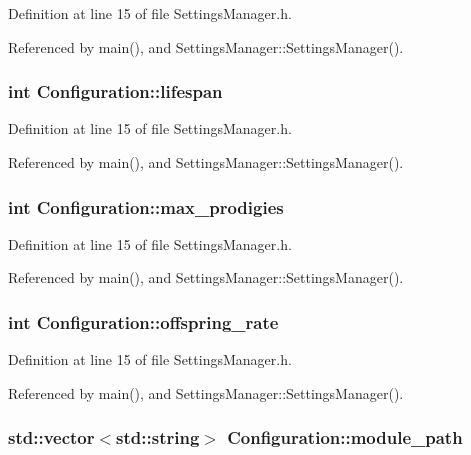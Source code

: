 Definition at line 15 of file SettingsManager.h.

Referenced by main(), and SettingsManager::SettingsManager().\hypertarget{classConfiguration_858ab0060803795860cfc447e6aa246e}{
\subsubsection{\setlength{\rightskip}{0pt plus 5cm}int {\bf Configuration::lifespan}}}
\label{classConfiguration_858ab0060803795860cfc447e6aa246e}




Definition at line 15 of file SettingsManager.h.

Referenced by main(), and SettingsManager::SettingsManager().\hypertarget{classConfiguration_be86bbb6446ce51bc97ef683830cea11}{
\subsubsection{\setlength{\rightskip}{0pt plus 5cm}int {\bf Configuration::max\_\-prodigies}}}
\label{classConfiguration_be86bbb6446ce51bc97ef683830cea11}




Definition at line 15 of file SettingsManager.h.

Referenced by main(), and SettingsManager::SettingsManager().\hypertarget{classConfiguration_10ea785ff3baedcfb867dffe0acf7b9d}{
\subsubsection{\setlength{\rightskip}{0pt plus 5cm}int {\bf Configuration::offspring\_\-rate}}}
\label{classConfiguration_10ea785ff3baedcfb867dffe0acf7b9d}




Definition at line 15 of file SettingsManager.h.

Referenced by main(), and SettingsManager::SettingsManager().\hypertarget{classConfiguration_c43157b4be129795ce999da8a09c9797}{
\subsubsection{\setlength{\rightskip}{0pt plus 5cm}std::vector$<$std::string$>$ {\bf Configuration::module\_\-path}}}
\label{classConfiguration_c43157b4be129795ce999da8a09c9797}




